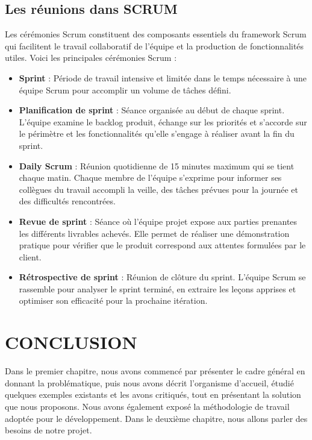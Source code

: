 \subsection{Les réunions dans SCRUM}

\noindent Les cérémonies Scrum constituent des composants essentiels du framework Scrum qui facilitent le travail collaboratif de l'équipe et la production de fonctionnalités utiles. Voici les principales cérémonies Scrum :
\begin{itemize}
    \item \textbf{Sprint} : Période de travail intensive et limitée dans le temps nécessaire à une équipe Scrum pour accomplir un volume de tâches défini.

    \item \textbf{Planification de sprint} : Séance organisée au début de chaque sprint. L'équipe examine le backlog produit, échange sur les priorités et s'accorde sur le périmètre et les fonctionnalités qu'elle s'engage à réaliser avant la fin du sprint.

    \item \textbf{Daily Scrum} : Réunion quotidienne de 15 minutes maximum qui se tient chaque matin. Chaque membre de l'équipe s'exprime pour informer ses collègues du travail accompli la veille, des tâches prévues pour la journée et des difficultés rencontrées.

    \item \textbf{Revue de sprint} : Séance où l'équipe projet expose aux parties prenantes les différents livrables achevés. Elle permet de réaliser une démonstration pratique pour vérifier que le produit correspond aux attentes formulées par le client.

    \item \textbf{Rétrospective de sprint} : Réunion de clôture du sprint. L'équipe Scrum se rassemble pour analyser le sprint terminé, en extraire les leçons apprises et optimiser son efficacité pour la prochaine itération.
\end{itemize}

\section*{CONCLUSION}

\noindent Dans le premier chapitre, nous avons commencé par présenter le cadre général en donnant la problématique, puis nous avons décrit l'organisme d'accueil, étudié quelques exemples existants et les avons critiqués, tout en présentant la solution que nous proposons. Nous avons également exposé la méthodologie de travail adoptée pour le développement. Dans le deuxième chapitre, nous allons parler des besoins de notre projet.